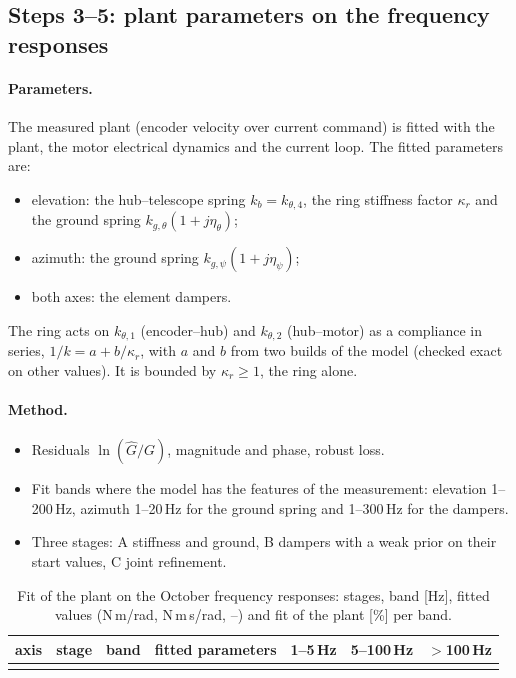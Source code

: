 \documentclass[10pt,a4paper]{article}
\numberwithin{equation}{section}
\begin{document}
\subsection{Steps 3--5: plant parameters on the frequency responses}
\paragraph{Parameters.} The measured plant (encoder velocity over current command) is fitted with the plant, the motor electrical dynamics and the current loop. The fitted parameters are:
\begin{itemize}
\item elevation: the hub--telescope spring $k_b=k_{\theta,4}$, the ring stiffness factor $\kappa_r$ and the ground spring $k_{g,\theta}(1+j\eta_\theta)$;
\item azimuth: the ground spring $k_{g,\psi}(1+j\eta_\psi)$;
\item both axes: the element dampers.
\end{itemize}
The ring acts on $k_{\theta,1}$ (encoder--hub) and $k_{\theta,2}$ (hub--motor) as a compliance in series, $1/k=a+b/\kappa_r$, with $a$ and $b$ from two builds of the model (checked exact on other values). It is bounded by $\kappa_r\ge 1$, the ring alone.

\paragraph{Method.}
\begin{itemize}
\item Residuals $\ln(\hat G/G)$, magnitude and phase, robust loss.
\item Fit bands where the model has the features of the measurement: elevation 1--200\,Hz, azimuth 1--20\,Hz for the ground spring and 1--300\,Hz for the dampers.
\item Three stages: A stiffness and ground, B dampers with a weak prior on their start values, C joint refinement.
\end{itemize}
\begin{table}[H]\centering\scriptsize
\caption{Fit of the plant on the October frequency responses: stages, band [Hz], fitted values (N\,m/rad, N\,m\,s/rad, --) and fit of the plant [\%] per band.}\label{tab:plant}
\begin{tabularx}{\linewidth}{lllYrrr}\toprule
axis & stage & band & fitted parameters & 1--5\,Hz & 5--100\,Hz & $>$100\,Hz \\ \midrule
\\ \bottomrule
\end{tabularx}\end{table}
\end{document}
